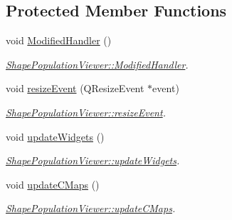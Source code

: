 \subsection*{Protected Member Functions}
\begin{DoxyCompactItemize}
\item 
void \hyperlink{class_shape_population_viewer_a7b0372882e3ed9407950cce2446d2c2e}{Modified\-Handler} ()
\begin{DoxyCompactList}\small\item\em \hyperlink{class_shape_population_viewer_a7b0372882e3ed9407950cce2446d2c2e}{Shape\-Population\-Viewer\-::\-Modified\-Handler}. \end{DoxyCompactList}\item 
void \hyperlink{class_shape_population_viewer_ae4f86b69e03ff6fe171055ef3284c2ae}{resize\-Event} (Q\-Resize\-Event $\ast$event)
\begin{DoxyCompactList}\small\item\em \hyperlink{class_shape_population_viewer_ae4f86b69e03ff6fe171055ef3284c2ae}{Shape\-Population\-Viewer\-::resize\-Event}. \end{DoxyCompactList}\item 
void \hyperlink{class_shape_population_viewer_aad65b6f3730b35df25452677b6d790e1}{update\-Widgets} ()
\begin{DoxyCompactList}\small\item\em \hyperlink{class_shape_population_viewer_aad65b6f3730b35df25452677b6d790e1}{Shape\-Population\-Viewer\-::update\-Widgets}. \end{DoxyCompactList}\item 
void \hyperlink{class_shape_population_viewer_a304c6d435fab8f04099d2bc42185f74b}{update\-C\-Maps} ()
\begin{DoxyCompactList}\small\item\em \hyperlink{class_shape_population_viewer_a304c6d435fab8f04099d2bc42185f74b}{Shape\-Population\-Viewer\-::update\-C\-Maps}. \end{DoxyCompactList}\end{DoxyCompactItemize}

